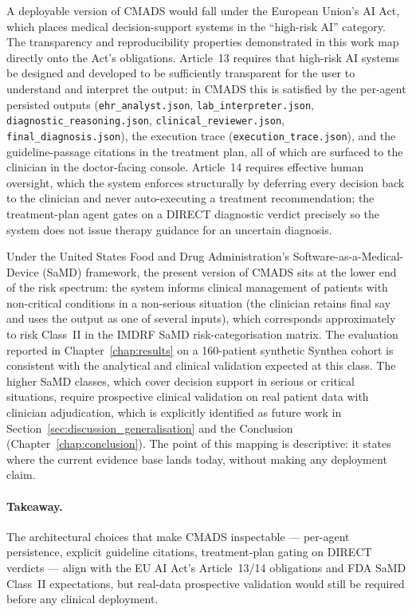 A deployable version of CMADS would fall under the European Union's
AI Act, which places medical decision-support systems in the
``high-risk AI'' category. The transparency and reproducibility
properties demonstrated in this work map directly onto the Act's
obligations. Article~13 requires that high-risk AI systems be
designed and developed to be sufficiently transparent for the user
to understand and interpret the output: in CMADS this is satisfied
by the per-agent persisted outputs (\texttt{ehr\_analyst.json},
\texttt{lab\_interpreter.json}, \texttt{diagnostic\_reasoning.json},
\texttt{clinical\_reviewer.json}, \texttt{final\_diagnosis.json}),
the execution trace (\texttt{execution\_trace.json}), and the
guideline-passage citations in the treatment plan, all of which are
surfaced to the clinician in the doctor-facing console. Article~14
requires effective human oversight, which the system enforces
structurally by deferring every decision back to the clinician and
never auto-executing a treatment recommendation; the treatment-plan
agent gates on a DIRECT diagnostic verdict precisely so the system
does not issue therapy guidance for an uncertain diagnosis.

Under the United States Food and Drug Administration's
Software-as-a-Medical-Device (SaMD) framework, the present version of
CMADS sits at the lower end of the risk spectrum: the system informs
clinical management of patients with non-critical conditions in a
non-serious situation (the clinician retains final say and uses the
output as one of several inputs), which corresponds approximately to
risk Class~II in the IMDRF SaMD risk-categorisation matrix. The
evaluation reported in Chapter~\ref{chap:results} on a 160-patient
synthetic Synthea cohort is consistent with the analytical and
clinical validation expected at this class. The higher SaMD classes,
which cover decision support in serious or critical situations,
require prospective clinical validation on real patient data with
clinician adjudication, which is explicitly identified as future
work in Section~\ref{sec:discussion_generalisation} and the
Conclusion (Chapter~\ref{chap:conclusion}). The point of this
mapping is descriptive: it states where the current evidence base
lands today, without making any deployment claim.

\paragraph{Takeaway.} The architectural choices that make CMADS
inspectable --- per-agent persistence, explicit guideline citations,
treatment-plan gating on DIRECT verdicts --- align with the EU AI
Act's Article~13/14 obligations and FDA SaMD Class~II expectations,
but real-data prospective validation would still be required before
any clinical deployment.


